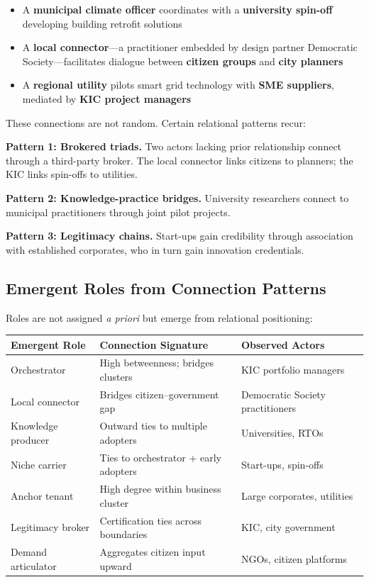 \documentclass[
    fontsize=10pt,
    twoside=true,
    secnumdepth=2,
    numbers=noenddot
]{kaobook}
\begin{document}
\begin{itemize}[noitemsep,topsep=2pt]
    \item A \textbf{municipal climate officer} coordinates with a \textbf{university spin-off} developing building retrofit solutions
    \item A \textbf{local connector}---a practitioner embedded by design partner Democratic Society---facilitates dialogue between \textbf{citizen groups} and \textbf{city planners}
    \item A \textbf{regional utility} pilots smart grid technology with \textbf{SME suppliers}, mediated by \textbf{KIC project managers}
\end{itemize}

These connections are not random. Certain relational patterns recur:

\textbf{Pattern 1: Brokered triads.} Two actors lacking prior relationship connect through a third-party broker. The local connector links citizens to planners; the KIC links spin-offs to utilities.

\textbf{Pattern 2: Knowledge-practice bridges.} University researchers connect to municipal practitioners through joint pilot projects.

\textbf{Pattern 3: Legitimacy chains.} Start-ups gain credibility through association with established corporates, who in turn gain innovation credentials.

\subsection{Emergent Roles from Connection Patterns}

Roles are not assigned \textit{a priori} but emerge from relational positioning:

\tablestriped
\small
\begin{center}
\begin{tabular}{@{}p{2.5cm}p{4.2cm}p{4.8cm}@{}}
\toprule
\textbf{Emergent Role} & \textbf{Connection Signature} & \textbf{Observed Actors} \\
\midrule
Orchestrator & High betweenness; bridges clusters & KIC portfolio managers \\
Local connector & Bridges citizen--government gap & Democratic Society practitioners \\
Knowledge producer & Outward ties to multiple adopters & Universities, RTOs \\
Niche carrier & Ties to orchestrator + early adopters & Start-ups, spin-offs \\
Anchor tenant & High degree within business cluster & Large corporates, utilities \\
Legitimacy broker & Certification ties across boundaries & KIC, city government \\
Demand articulator & Aggregates citizen input upward & NGOs, citizen platforms \\
\bottomrule
\end{tabular}
\label{tab:emergent-roles}
\end{center}
\normalsize
\end{document}

